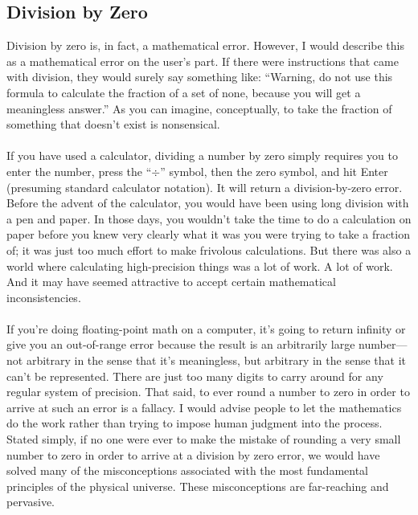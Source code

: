 \documentclass[twoside,twocolumn,9pt]{article}
\begin{document}
\subsection{Division by Zero}
Division by zero is, in fact, a mathematical error. However, I would describe this as a mathematical error on the user's part. If there were instructions that came with division, they would surely say something like: ``Warning, do not use this formula to calculate the fraction of a set of none, because you will get a meaningless answer.'' As you can imagine, conceptually, to take the fraction of something that doesn't exist is nonsensical.\\
\\
If you have used a calculator, dividing a number by zero simply requires you to enter the number, press the ``$\div$'' symbol, then the zero symbol, and hit Enter (presuming standard calculator notation). It will return a division-by-zero error. Before the advent of the calculator, you would have been using long division with a pen and paper. In those days, you wouldn't take the time to do a calculation on paper before you knew very clearly what it was you were trying to take a fraction of; it was just too much effort to make frivolous calculations. But there was also a world where calculating high-precision things was a lot of work. A lot of work. And it may have seemed attractive to accept certain mathematical inconsistencies.\\
\\
If you're doing floating-point math on a computer, it's going to return infinity or give you an out-of-range error because the result is an arbitrarily large number---not arbitrary in the sense that it's meaningless, but arbitrary in the sense that it can't be represented. There are just too many digits to carry around for any regular system of precision. That said, to ever round a number to zero in order to arrive at such an error is a fallacy. I would advise people to let the mathematics do the work rather than trying to impose human judgment into the process. Stated simply, if no one were ever to make the mistake of rounding a very small number to zero in order to arrive at a division by zero error, we would have solved many of the misconceptions associated with the most fundamental principles of the physical universe. These misconceptions are far-reaching and pervasive.\\
\\
\end{document}
